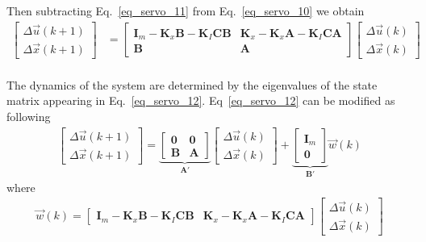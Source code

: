 \documentclass[11pt,a4paper,oneside]{book}
\numberwithin{equation}{section}
\theoremstyle{it}
\theoremstyle{definition}
\begin{document}
Then subtracting Eq.~\eqref{eq_servo_11} from Eq.~\eqref{eq_servo_10} we obtain
\begin{equation}\label{eq_servo_12}
	\begin{aligned}
		\begin{bmatrix}
			\Delta\vec{u}(k+1) \\[6pt]  
			\Delta\vec{x}(k+1)
		\end{bmatrix} &=
		\begin{bmatrix}
			\mathbf{I}_m-\mathbf{K}_x\mathbf{B}-\mathbf{K}_I\mathbf{C}\mathbf{B}
			&  
			\mathbf{K}_x-\mathbf{K}_x\mathbf{A}-\mathbf{K}_I\mathbf{C}\mathbf{A}\\[6pt]
			
			\mathbf{B} & \mathbf{A}
		\end{bmatrix}
		\begin{bmatrix}
			\Delta\vec{u}(k) \\[6pt]  
			\Delta\vec{x}(k)
		\end{bmatrix}
	\end{aligned}
\end{equation}\\
The dynamics of the system are determined by the eigenvalues of the state 
matrix appearing in Eq.~\eqref{eq_servo_12}. Eq~\eqref{eq_servo_12} can be 
modified as following
\begin{equation}\label{eq_servo_13}
	\begin{aligned}
		\begin{bmatrix}
			\Delta\vec{u}(k+1) \\[6pt]  
			\Delta\vec{x}(k+1)
		\end{bmatrix} =
		\underbrace{\begin{bmatrix}
				\mathbf{0} & \mathbf{0} \\[6pt]  
				\mathbf{B} & \mathbf{A}
		\end{bmatrix}}_{\mathbf{A'}}
		\begin{bmatrix}
			\Delta\vec{u}(k) \\[6pt]  
			\Delta\vec{x}(k)
		\end{bmatrix}+
		\underbrace{\begin{bmatrix}
				\mathbf{I}_m \\[6pt]  
				\mathbf{0}
		\end{bmatrix}}_{\mathbf{B'}}\vec{w}(k)
	\end{aligned}
\end{equation}
where 
\begin{equation}\label{eq_servo_14}
	\begin{aligned}
		\vec{w}(k) = 
		\begin{bmatrix}
			\mathbf{I}_m-\mathbf{K}_x\mathbf{B}-\mathbf{K}_I\mathbf{C}\mathbf{B}
			&  
			\mathbf{K}_x-\mathbf{K}_x\mathbf{A}-\mathbf{K}_I\mathbf{C}\mathbf{A}
		\end{bmatrix}
		\begin{bmatrix}
			\Delta\vec{u}(k) \\[6pt]  
			\Delta\vec{x}(k)
		\end{bmatrix}
	\end{aligned}
\end{equation}
\end{document}
